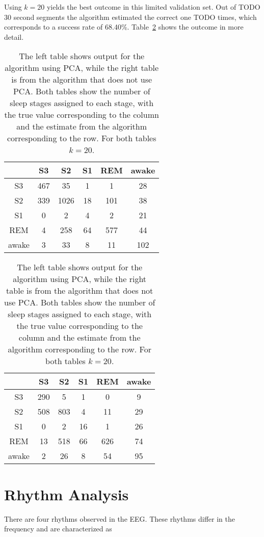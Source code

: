 Using $k=20$ yields the best outcome in this limited validation set. Out of TODO 30 second segments the algorithm estimated the correct one TODO times, which corresponds to a success rate of 68.40\%. Table~\ref{tab:error_validation} shows the outcome in more detail.

\begin{table}
	\centering
	\begin{subtable}{0.48\textwidth}
		\begin{tabular}{c|ccccc}
			    & S3  & S2  & S1 & REM & awake \\
			\hline
			S3 & 467  & 35  & 1  & 1  & 28 \\
			S2 & 339  & 1026  & 18  & 101  & 38 \\
			S1 & 0  & 2  & 4  & 2  & 21 \\
			REM & 4  & 258  & 64  & 577  & 44 \\
			awake & 3  & 33  & 8  & 11  & 102 \\
		\end{tabular}
	\end{subtable}
	\hfill
	\begin{subtable}{0.48\textwidth}
		\begin{tabular}{c|ccccc}
			   & S3  & S2  & S1 & REM & awake \\
			\hline
			S3 & 290  & 5  & 1  & 0  & 9 \\
			S2 & 508  & 803  & 4  & 11  & 29 \\
			S1 & 0  & 2  & 16  & 1  & 26 \\
			REM & 13  & 518  & 66  & 626  & 74 \\
			awake & 2  & 26  & 8  & 54  & 95 \\
		\end{tabular}
	\end{subtable}
	
	\caption{The left table shows output for the algorithm using PCA, while the right table is from the algorithm that does not use PCA. Both tables show the number of sleep stages assigned to each stage, with the true value corresponding to the column and the estimate from the algorithm corresponding to the row. For both tables $k=20$.}
	\label{tab:error_validation}
\end{table}


\section{Rhythm Analysis}
There are four rhythms observed in the EEG\cite[chapter~11]{Ganong1997}. These rhythms differ in the frequency and are characterized as

